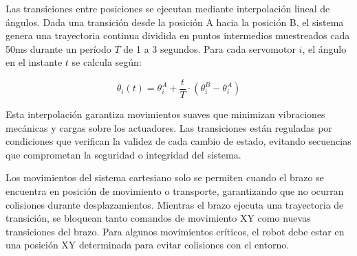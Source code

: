 Las transiciones entre posiciones se ejecutan mediante interpolación lineal de ángulos. Dada una transición desde la posición A hacia la posición B, el sistema genera una trayectoria continua dividida en puntos intermedios muestreados cada 50ms durante un período $T$ de 1 a 3 segundos. Para cada servomotor $i$, el ángulo en el instante $t$ se calcula según:

\begin{equation}
\theta_i(t) = \theta_i^A + \frac{t}{T} \cdot (\theta_i^B - \theta_i^A)
\end{equation}

Esta interpolación garantiza movimientos suaves que minimizan vibraciones mecánicas y cargas sobre los actuadores. Las transiciones están reguladas por condiciones que verifican la validez de cada cambio de estado, evitando secuencias que comprometan la seguridad o integridad del sistema. 

Los movimientos del sistema cartesiano solo se permiten cuando el brazo se encuentra en posición de movimiento o transporte, garantizando que no ocurran colisiones durante desplazamientos. Mientras el brazo ejecuta una trayectoria de transición, se bloquean tanto comandos de movimiento XY como nuevas transiciones del brazo. Para algunos movimientos críticos, el robot debe estar en una posición XY determinada para evitar colisiones con el entorno.